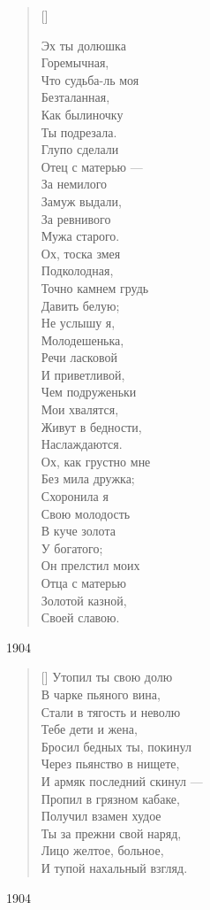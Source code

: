 \settowidth{\versewidth}{Эх ты долюшка}
\begin{verse}[\versewidth]
\begin{altverse}
Эх ты долюшка\\
Горемычная,\\
Что судьба-ль моя\\
Безталанная,\\
Как былиночку\\
Ты подрезала.\\
Глупо сделали\\
Отец с матерью ---\\
За немилого\\
Замуж выдали,\\
За ревнивого\\
Мужа старого.\\
Ох, тоска змея\\
Подколодная,\\
Точно камнем грудь\\
Давить белую;\\
Не услышу я,\\
Молодешенька,\\
Речи ласковой\\
И приветливой,\\
Чем подруженьки\\
Мои хвалятся,\\
Живут в бедности,\\
Наслаждаются.\\
Ох, как грустно мне\\
Без мила дружка;\\
Схоронила я\\
Свою молодость\\
В куче золота\\
У богатого;\\
Он прелстил моих\\
Отца с матерью\\
Золотой казной,\\
Своей славою.
\end{altverse}
\end{verse}
1904



\settowidth{\versewidth}{Утопил ты свою долю}
\begin{verse}[\versewidth]
Утопил ты свою долю\\
В чарке пьяного вина,\\
Стали в тягость и неволю\\
Тебе дети и жена,\\
Бросил бедных ты, покинул\\
Через пьянство в нищете,\\
И армяк последний скинул ---\\
Пропил в грязном кабаке,\\
Получил взамен худое\\
Ты за прежни свой наряд,\\
Лицо желтое, больное,\\
И тупой нахальный взгляд.
\end{verse}
1904




